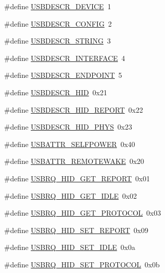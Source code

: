 \begin{DoxyCompactItemize}
\item 
\#define \hyperlink{mhvlib-_vusb-_console_2vusb_2usbdrv_8h_a5b76593f7b6295a4a599aba4476ec258}{U\-S\-B\-D\-E\-S\-C\-R\-\_\-\-D\-E\-V\-I\-C\-E}~1
\item 
\#define \hyperlink{mhvlib-_vusb-_console_2vusb_2usbdrv_8h_a6ff1081ad7212a0c7009ef5b79f3669f}{U\-S\-B\-D\-E\-S\-C\-R\-\_\-\-C\-O\-N\-F\-I\-G}~2
\item 
\#define \hyperlink{mhvlib-_vusb-_console_2vusb_2usbdrv_8h_aabd48b46ba597bd32ce5c64a7aad23c4}{U\-S\-B\-D\-E\-S\-C\-R\-\_\-\-S\-T\-R\-I\-N\-G}~3
\item 
\#define \hyperlink{mhvlib-_vusb-_console_2vusb_2usbdrv_8h_a1ce81e6fb124d8747018b4343faa65ba}{U\-S\-B\-D\-E\-S\-C\-R\-\_\-\-I\-N\-T\-E\-R\-F\-A\-C\-E}~4
\item 
\#define \hyperlink{mhvlib-_vusb-_console_2vusb_2usbdrv_8h_ab2c475dbe374ed8bc514893fb97a6083}{U\-S\-B\-D\-E\-S\-C\-R\-\_\-\-E\-N\-D\-P\-O\-I\-N\-T}~5
\item 
\#define \hyperlink{mhvlib-_vusb-_console_2vusb_2usbdrv_8h_ade4fe1fba6aca94a379fdbacbbcc6800}{U\-S\-B\-D\-E\-S\-C\-R\-\_\-\-H\-I\-D}~0x21
\item 
\#define \hyperlink{mhvlib-_vusb-_console_2vusb_2usbdrv_8h_af2ef6d7e2fe214a3d3a14f5419550bb0}{U\-S\-B\-D\-E\-S\-C\-R\-\_\-\-H\-I\-D\-\_\-\-R\-E\-P\-O\-R\-T}~0x22
\item 
\#define \hyperlink{mhvlib-_vusb-_console_2vusb_2usbdrv_8h_a046aff487dd2c149d8df8ebf01a1f05d}{U\-S\-B\-D\-E\-S\-C\-R\-\_\-\-H\-I\-D\-\_\-\-P\-H\-Y\-S}~0x23
\item 
\#define \hyperlink{mhvlib-_vusb-_console_2vusb_2usbdrv_8h_afa0dd9c06af4b033461ba3c755ca90bb}{U\-S\-B\-A\-T\-T\-R\-\_\-\-S\-E\-L\-F\-P\-O\-W\-E\-R}~0x40
\item 
\#define \hyperlink{mhvlib-_vusb-_console_2vusb_2usbdrv_8h_a4f6ede34dea10d728413690ac694a74b}{U\-S\-B\-A\-T\-T\-R\-\_\-\-R\-E\-M\-O\-T\-E\-W\-A\-K\-E}~0x20
\item 
\#define \hyperlink{mhvlib-_vusb-_console_2vusb_2usbdrv_8h_ab0c796905d6a7d0bfc605f8c3e252437}{U\-S\-B\-R\-Q\-\_\-\-H\-I\-D\-\_\-\-G\-E\-T\-\_\-\-R\-E\-P\-O\-R\-T}~0x01
\item 
\#define \hyperlink{mhvlib-_vusb-_console_2vusb_2usbdrv_8h_aebf7c3254b56413d7679b89bb99e144c}{U\-S\-B\-R\-Q\-\_\-\-H\-I\-D\-\_\-\-G\-E\-T\-\_\-\-I\-D\-L\-E}~0x02
\item 
\#define \hyperlink{mhvlib-_vusb-_console_2vusb_2usbdrv_8h_ac70990c038444434de16c30399e92640}{U\-S\-B\-R\-Q\-\_\-\-H\-I\-D\-\_\-\-G\-E\-T\-\_\-\-P\-R\-O\-T\-O\-C\-O\-L}~0x03
\item 
\#define \hyperlink{mhvlib-_vusb-_console_2vusb_2usbdrv_8h_af0b62de651c6d73af4cfb1cee123c312}{U\-S\-B\-R\-Q\-\_\-\-H\-I\-D\-\_\-\-S\-E\-T\-\_\-\-R\-E\-P\-O\-R\-T}~0x09
\item 
\#define \hyperlink{mhvlib-_vusb-_console_2vusb_2usbdrv_8h_a0d7b2ebb28c23a8bd2fb4a630b85ad71}{U\-S\-B\-R\-Q\-\_\-\-H\-I\-D\-\_\-\-S\-E\-T\-\_\-\-I\-D\-L\-E}~0x0a
\item 
\#define \hyperlink{mhvlib-_vusb-_console_2vusb_2usbdrv_8h_a831d5e0db9e559706e54acc2e7b5278c}{U\-S\-B\-R\-Q\-\_\-\-H\-I\-D\-\_\-\-S\-E\-T\-\_\-\-P\-R\-O\-T\-O\-C\-O\-L}~0x0b
\end{DoxyCompactItemize}
